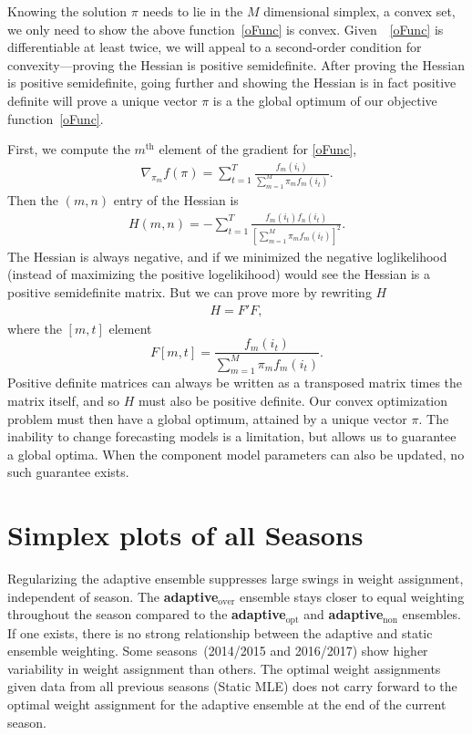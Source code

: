 \documentclass[12pt]{article}
\def\l{\left}
\def\r{\right}
\newcommand{\f}{\frac}
\def\adaptNon{\textbf{adaptive$_{\text{non}}$ }}
\def\adaptOpt{\textbf{adaptive$_{\text{opt}}$ }}
\def\adaptOver{\textbf{adaptive$_{\text{over}}$ }}
\begin{document}
Knowing the solution $\pi$ needs to lie in the $M$ dimensional simplex, a convex set, we only need to show the above function~\eqref{oFunc} is convex.
Given~~\eqref{oFunc} is differentiable at least twice, we will appeal to a second-order condition for convexity---proving the Hessian is positive semidefinite.
After proving the Hessian is positive semidefinite, going further and showing the Hessian is in fact positive definite will prove a unique vector $\pi$ is a the global optimum of our objective function~\eqref{oFunc}.

First, we compute the $m^{\text{th}}$ element of the gradient for \eqref{oFunc},
\begin{align*}
  \nabla_{\pi_m} f(\pi) = \sum_{t=1}^{T} \f{f_{m}(i_{i})}{\sum_{m=1}^{M} \pi_mf_{m}(i_{t}) }.
\end{align*}
Then the $(m,n)$ entry of the Hessian is
\begin{align*}
  H(m,n) = - \sum_{t=1}^{T} \f{ f_{m}(i_{t}) f_{n}(i_{t})}{ \l[\sum_{m=1}^{M} \pi_mf_{m}(i_{t})  \r]^{2} }.
\end{align*}
The Hessian is always negative, and if we minimized the negative loglikelihood (instead of maximizing the positive logelikihood) would see the Hessian is a positive semidefinite matrix.
But we can prove more by rewriting $H$
\begin{align*}
 H = F'F,
\end{align*}
where the $[m,t]$ element
\begin{equation*}
  F[m,t] = \f{f_{m}(i_{t})}{\sum_{m=1}^{M}\pi_mf_{m}(i_{t})}.
\end{equation*}
Positive definite matrices can always be written as a transposed matrix times the matrix itself, and so $H$ must also be positive definite.
Our convex optimization problem must then have a global optimum, attained by a unique vector $\pi$.
The inability to change forecasting models is a limitation, but allows us to guarantee a global optima.
When the component model parameters can also be updated, no such guarantee exists.


\section{Simplex plots of all Seasons}
\label{simplexplot}

Regularizing the adaptive ensemble suppresses large swings in weight assignment, independent of season.
The \adaptOver ensemble stays closer to equal weighting throughout the season compared to the \adaptOpt and \adaptNon ensembles.
If one exists, there is no strong relationship between the adaptive and static ensemble weighting.
Some seasons~(2014/2015 and 2016/2017) show higher variability in weight assignment than others.
The optimal weight assignments given data from all previous seasons (Static MLE) does not carry forward to the optimal weight assignment for the adaptive ensemble at the end of the current season.  
\end{document}
